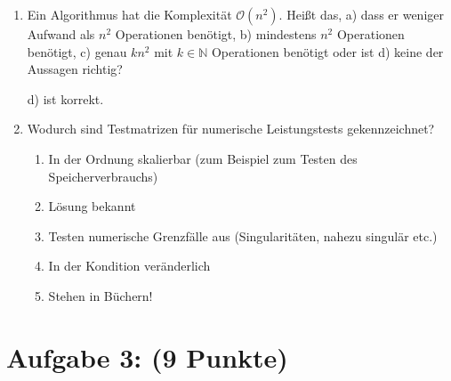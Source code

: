 \documentclass[12pt]{article}
\begin{document}
\begin{enumerate}
	
	\item Ein Algorithmus hat die Komplexität $\mathcal{O}(n^2)$. Heißt das, a) dass er weniger Aufwand als $n^2$ Operationen benötigt, b) mindestens $n^2$ Operationen benötigt, c) genau $kn^2$ mit $k\in \mathbb{N}$ Operationen benötigt oder ist d) keine der Aussagen richtig?
	\begin{solution}
		d) ist korrekt.	
	\end{solution}

	\pagebreak

\pagebreak
	\item Wodurch sind Testmatrizen für numerische Leistungstests gekennzeichnet?
\vspace{-0.5cm}	
	\begin{solution}
		\begin{enumerate}[label=$(\roman*)$]
			\item In der Ordnung skalierbar (zum Beispiel zum Testen des Speicherverbrauchs)
			\item Lösung bekannt
			\item Testen numerische Grenzfälle aus (Singularitäten, nahezu singulär etc.)
			\item In der Kondition veränderlich
			\item Stehen in Büchern!
		\end{enumerate}			
	\end{solution}



\end{enumerate}

\pagebreak

\section*{Aufgabe 3: (9 Punkte)}
\end{document}
